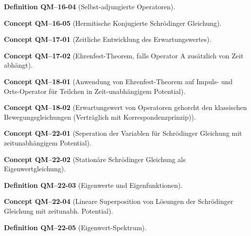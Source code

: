 \documentclass[10pt, letterpaper]{article}
\newcommand{\CustomHeading}[3]{%
  \par\medskip\noindent%
  \textbf{#1 #2} \textnormal{(#3)}.\enskip%
}
\newenvironment{DEF}[2]{\CustomHeading{Definition}{#1}{#2}}{}
\newenvironment{CONC}[2]{\CustomHeading{Concept}{#1}{#2}}{}
\begin{document}
\begin{DEF}{QM--16-04}{Selbst-adjungierte Operatoren}
\end{DEF}

\begin{CONC}{QM--16-05}{Hermitische Konjugierte Schrödinger Gleichung}
\end{CONC}

\begin{CONC}{QM--17-01}{Zeitliche Entwicklung des Erwartungswertes}
\end{CONC}

\begin{CONC}{QM--17-02}{Ehrenfest-Theorem, falls Operator A zusätzlich von Zeit abhängt}
\end{CONC}

\begin{CONC}{QM--18-01}{Anwendung von Ehrenfest-Theorem auf Impuls- und Orts-Operator für Teilchen in Zeit-unabhängigem Potential}
\end{CONC}

\begin{CONC}{QM--18-02}{Erwartungswert von Operatoren gehorcht den klassischen Bewegungsgleichungen (Verträglich mit Korrespondenzprinzip)}
\end{CONC}

\begin{CONC}{QM--22-01}{Seperation der Variablen für Schrödinger Gleichung mit zeitunabhängigem Potential}
\end{CONC}

\begin{CONC}{QM--22-02}{Stationäre Schrödinger Gleichung als Eigenwertgleichung}
\end{CONC}

\begin{DEF}{QM--22-03}{Eigenwerte und Eigenfunktionen}
\end{DEF}

\begin{CONC}{QM--22-04}{Lineare Superposition von Lösungen der Schrödinger Gleichung mit zeitunabh. Potential}
\end{CONC}

\begin{DEF}{QM--22-05}{Eigenwert-Spektrum}
\end{DEF}
\end{document}
